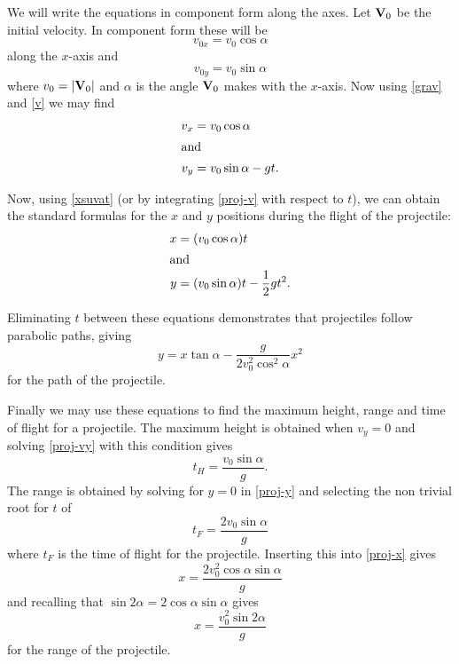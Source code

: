 We will write the equations in component form along the axes. Let $\mathbf{V}_0$ be the initial velocity.
In component form these will be
\[
v_{0x} = v_0 \cos \alpha
\]
along the $x$-axis and
\[
v_{0y} = v_0 \sin \alpha
\]
where $v_0 = |\mathbf{V}_0|$ and $\alpha$ is the angle $\mathbf{V}_0$ makes with the $x$-axis. Now using \eqref{grav}
and \eqref{v} we may find
\begin{subequations} \label{proj-v}
\begin{align}
v_x &= v_0 \cos \alpha \\
\shortintertext{and}
v_y &= v_0 \sin \alpha - gt . \label{proj-vy}
\end{align}
\end{subequations}

Now, using \eqref{xsuvat} (or by integrating \eqref{proj-v} with respect to $t$), we can obtain the 
standard formulas for the $x$ and $y$ positions during the flight of the projectile:
\begin{subequations}
\begin{align}
x &= (v_0 \cos \alpha) t \label{proj-x} \\
\shortintertext{and}
y &= (v_0 \sin \alpha) t - \frac{1}{2} g t^2 \label{proj-y} .
\end{align}
\end{subequations}

Eliminating $t$ between these equations demonstrates that projectiles follow parabolic
paths, giving
\begin{equation}
y = x \tan \alpha - \frac{g}{2v_0^2 \cos^2 \alpha} x^2
\end{equation}
for the path of the projectile.

Finally we may use these equations to find the maximum height, range and time of flight for a
projectile. The maximum height is obtained when $v_y = 0$ and solving \eqref{proj-vy} with this
condition gives
\begin{equation} \label{proj-height}
t_{H} = \frac{v_0 \sin \alpha}{g} .
\end{equation}
The range is obtained by solving for $y=0$ in \eqref{proj-y} and selecting the non trivial root for $t$
of
\begin{equation}
t_{F} = \frac{2 v_0 \sin \alpha}{g}
\end{equation}
where $t_{F}$ is the time of flight for the projectile. Inserting this into \eqref{proj-x} gives
\[
x = \frac{2 v_0^2 \cos \alpha \sin \alpha}{g}
\]
and recalling that $\sin 2 \alpha = 2 \cos \alpha \sin \alpha$ gives
\begin{equation}
x = \frac{v_0^2 \sin 2 \alpha}{g}
\end{equation}
for the range of the projectile.
